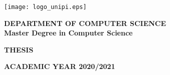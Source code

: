 \begin{titlepage}
	\begin{center}
		\texttt{[image: logo\_unipi.eps]}

		\vspace{1cm}
		\large
		\textbf{\MakeUppercase{Department of Computer Science}}\\
		\textbf{Master Degree in Computer Science}

		\vspace{3cm}
		\Large
		\textbf{\MakeUppercase{Thesis}}

		\vspace{0.5cm}
		\LARGE
		\textbf{\thesistitle}

		\vspace{3.5cm}
		\Large
		\peopleheader
		\textbf{\authornamefl} \hfill \textbf{\supervisors}        

		\vfill
		\large
		\textbf{\MakeUppercase{Academic year 2020/2021}}
    \end{center}
\end{titlepage}